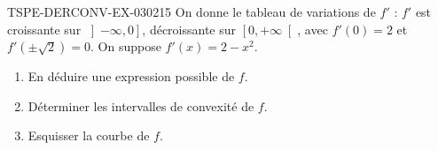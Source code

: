 \begin{exercice}{TSPE-DERCONV-EX-030}{2}{15}
On donne le tableau de variations de $f'$ : $f'$ est croissante sur $\left]-\infty, 0\right]$, décroissante sur $\left[0, +\infty\right[$, avec $f'(0) = 2$ et $f'(\pm\sqrt{2}) = 0$. On suppose $f'(x) = 2 - x^2$.
\begin{enumerate}
  \item En déduire une expression possible de $f$.
  \item Déterminer les intervalles de convexité de $f$.
  \item Esquisser la courbe de $f$.
\end{enumerate}

\end{exercice}
